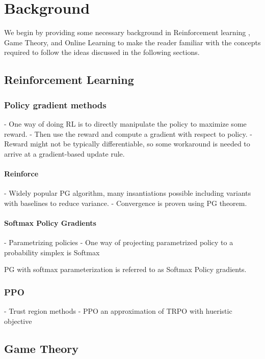 \chapter{Background}

We begin by providing some necessary background in Reinforcement learning , Game Theory, and Online
Learning to make the reader familiar with the concepts required to follow the ideas discussed in
the following sections.

\section{Reinforcement
  Learning}

\subsection{Policy gradient methods}
- One way of doing RL is to directly manipulate the policy to maximize some reward.
- Then use the reward and compute a gradient with respect to policy.
- Reward might not be typically differentiable, so some workaround is needed to arrive at a gradient-based update rule.

\subsubsection{Reinforce}
- Widely popular PG algorithm, many insantiations possible including variants with baselines to reduce variance.
- Convergence is proven using PG theorem.

\subsubsection{Softmax Policy Gradients}\label{sec:spg}
- Parametrizing policies
- One way of projecting parametrized policy to a probability simplex is Softmax

PG with softmax parameterization is referred to as Softmax Policy gradients.

\subsection{PPO}

- Trust region methods
- PPO an approximation of TRPO with hueristic objective

\section{Game Theory}

